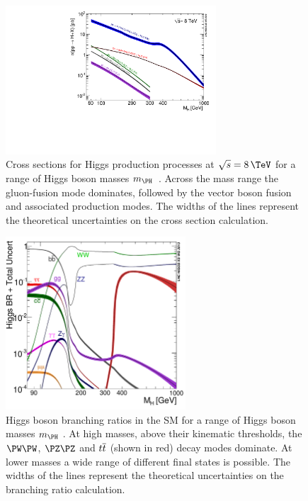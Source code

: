\begin{figure}[htbp]
 \includegraphics[width=0.7\textwidth]{Chapter01/Images/Higgs_XS_8TeV_lx.pdf}
\caption[Cross sections for Higgs production processes at $\sqrt{s}=8\,\TeV$ for
a range of Higgs boson masses.]{Cross sections for Higgs production processes at
$\sqrt{s}=8\,\TeV$ for a range of Higgs boson masses $m_{\PH}$~\cite{ARTICLE:HandbookofLHCHiggsCrossSectionsHiggsProperties}. Across the
mass range the gluon-fusion mode dominates, followed by the vector boson fusion
and associated production modes. The widths of the lines represent the
theoretical uncertainties on the cross section calculation.}
\label{fig:SMHiggsXS}
\end{figure}

\begin{figure}[htbp]
 \includegraphics[width=0.6\textwidth]{Chapter01/Images/Higgs_BR.pdf}
\caption[Higgs boson branching ratios in the SM for a range of Higgs boson
masses.]{Higgs boson branching ratios in the SM for a range of Higgs boson
masses $m_{\PH}$ \cite{ARTICLE:HandbookofLHCHiggsCrossSectionsHiggsProperties}. At high masses, above their
kinematic thresholds, the $\PW\PW$,
$\PZ\PZ$ and $t\overline{t}$ (shown in red) decay modes dominate. 
At lower masses a wide range of different final states is possible. 
The widths of the lines represent the
theoretical uncertainties on the branching ratio calculation.}
\label{fig:SMHiggsBRs}
\end{figure}

